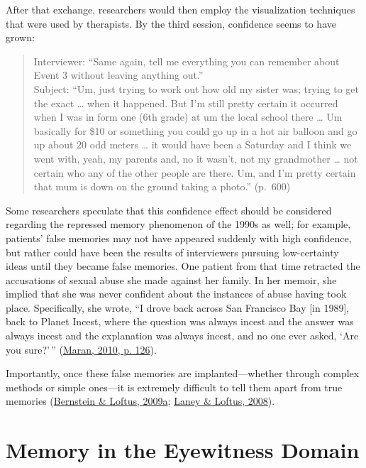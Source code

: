 \documentclass[
]{krantz}
\begin{document}
After that exchange, researchers would then employ the visualization techniques that were used by therapists. By the third session, confidence seems to have grown:

\begin{quote}
Interviewer: ``Same again, tell me everything you can remember about Event 3 without leaving anything out.''\\
Subject: ``Um, just trying to work out how old my sister was; trying to get the exact \ldots{} when it happened. But I'm still pretty certain it occurred when I was in form one (6th grade) at um the local school there \ldots{} Um basically for \$10 or something you could go up in a hot air balloon and go up about 20 odd meters \ldots{} it would have been a Saturday and I think we went with, yeah, my parents and, no it wasn't, not my grandmother \ldots{} not certain who any of the other people are there. Um, and I'm pretty certain that mum is down on the ground taking a photo.'' (p.~600)
\end{quote}

Some researchers speculate that this confidence effect should be considered regarding the repressed memory phenomenon of the 1990s as well; for example, patients' false memories may not have appeared suddenly with high confidence, but rather could have been the results of interviewers pursuing low-certainty ideas until they became false memories. One patient from that time retracted the accusations of sexual abuse she made against her family. In her memoir, she implied that she was never confident about the instances of abuse having took place. Specifically, she wrote, ``I drove back across San Francisco Bay {[}in 1989{]}, back to Planet Incest, where the question was always incest and the answer was always incest and the explanation was always incest, and no one ever asked, `Are you sure?'\,'' (\protect\hyperlink{ref-maran2010my}{Maran, 2010, p. 126}).

Importantly, once these false memories are implanted---whether through complex methods or simple ones---it is extremely difficult to tell them apart from true memories (\protect\hyperlink{ref-Bernstein2009a}{Bernstein \& Loftus, 2009a}; \protect\hyperlink{ref-Laney2008}{Laney \& Loftus, 2008}).

\hypertarget{memory-in-the-eyewitness-domain}{%
\section{Memory in the Eyewitness Domain}\label{memory-in-the-eyewitness-domain}}
\end{document}
